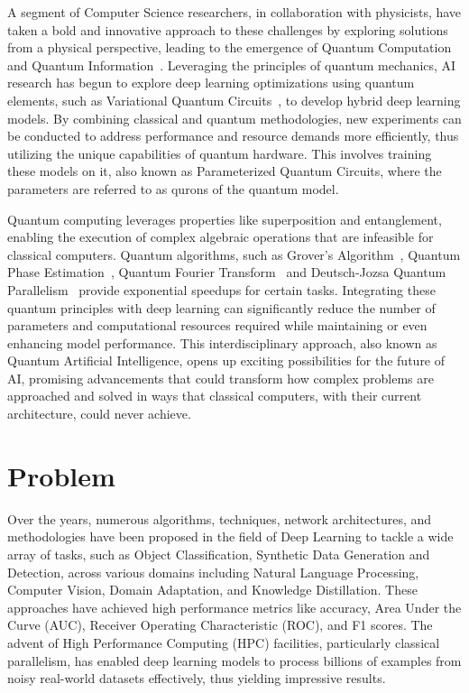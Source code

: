 \documentclass[12pt,a4paper]{report}
\begin{document}
A segment of Computer Science researchers, in collaboration with physicists, have taken a bold and innovative approach to these challenges by exploring solutions from a physical perspective, leading to the emergence of Quantum Computation and Quantum Information~\cite{nielsen2001quantum}. Leveraging the principles of quantum mechanics, AI research has begun to explore deep learning optimizations using quantum elements, such as Variational Quantum Circuits~\cite{cerezo2021variational}, to develop hybrid deep learning models. By combining classical and quantum methodologies, new experiments can be conducted to address performance and resource demands more efficiently, thus utilizing the unique capabilities of quantum hardware. This involves training these models on it, also known as Parameterized Quantum Circuits, where the parameters are referred to as qurons of the quantum model.

Quantum computing leverages properties like superposition and entanglement, enabling the execution of complex algebraic operations that are infeasible for classical computers. Quantum algorithms, such as Grover's Algorithm~\cite{shi2017coherence}, Quantum Phase Estimation~\cite{o2019quantum}, Quantum Fourier Transform~\cite{weinstein2001implementation} and Deutsch-Jozsa Quantum Parallelism~\cite{gulde2003implementation} provide exponential speedups for certain tasks. Integrating these quantum principles with deep learning can significantly reduce the number of parameters and computational resources required while maintaining or even enhancing model performance. This interdisciplinary approach, also known as Quantum Artificial Intelligence, opens up exciting possibilities for the future of AI, promising advancements that could transform how complex problems are approached and solved in ways that classical computers, with their current architecture, could never achieve.
\section{Problem}\vspace{-15pt}
Over the years, numerous algorithms, techniques, network architectures, and methodologies have been proposed in the field of Deep Learning to tackle a wide array of tasks, such as Object Classification, Synthetic Data Generation and Detection, across various domains including Natural Language Processing, Computer Vision, Domain Adaptation, and Knowledge Distillation. These approaches have achieved high performance metrics like accuracy, Area Under the Curve (AUC), Receiver Operating Characteristic (ROC), and F1 scores. The advent of High Performance Computing (HPC) facilities, particularly classical parallelism, has enabled deep learning models to process billions of examples from noisy real-world datasets effectively, thus yielding impressive results.
\end{document}
